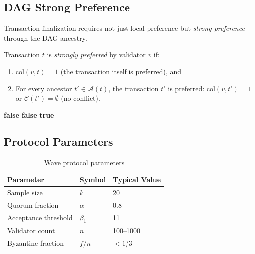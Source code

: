 \subsection{DAG Strong Preference}

Transaction finalization requires not just local preference but \emph{strong preference}
through the DAG ancestry.

\begin{definition}
\label{def:strong-pref}
Transaction $t$ is \emph{strongly preferred} by validator $v$ if:
\begin{enumerate}[nosep]
\item $\text{col}(v, t) = 1$ (the transaction itself is preferred), and
\item For every ancestor $t' \in \mathcal{A}(t)$, the transaction $t'$ is preferred:
$\text{col}(v, t') = 1$ or $\mathcal{C}(t') = \emptyset$ (no conflict).
\end{enumerate}
\end{definition}

\begin{algorithm}[H]
\caption{Wave DAG Strong Preference Check}
\label{alg:wave-dag}
\begin{algorithmic}[1]
        \Return \textbf{false}
    \EndIf
     
            \Return \textbf{false} 
        \EndIf
    \EndFor
    \Return \textbf{true}
\EndFunction
\end{algorithmic}
\end{algorithm}

\subsection{Protocol Parameters}

\begin{table}[h]
\centering
\begin{tabular}{@{}lll@{}}
\toprule
\textbf{Parameter} & \textbf{Symbol} & \textbf{Typical Value} \\
\midrule
Sample size & $k$ & 20 \\
Quorum fraction & $\alpha$ & 0.8 \\
Acceptance threshold & $\beta_1$ & 11 \\
Validator count & $n$ & 100--1000 \\
Byzantine fraction & $f/n$ & $< 1/3$ \\
\bottomrule
\end{tabular}
\caption{Wave protocol parameters}
\label{tab:params}
\end{table}

